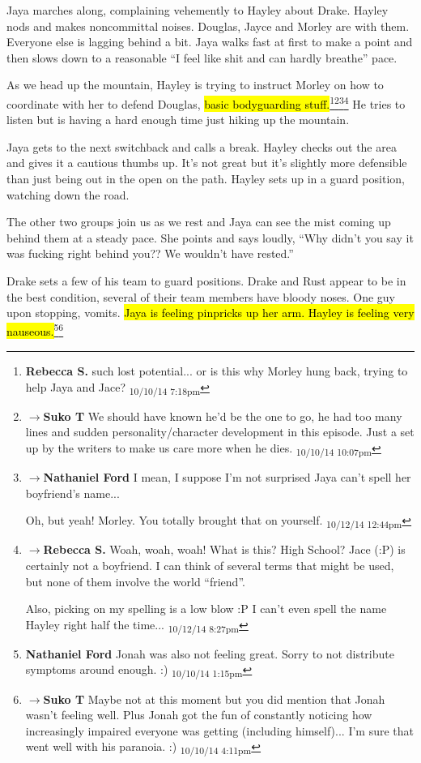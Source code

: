 Jaya marches along, complaining vehemently to Hayley about Drake.  Hayley nods and makes noncommittal noises.  Douglas, Jayce and Morley are with them.  Everyone else is lagging behind a bit.  Jaya walks fast at first to make a point and then slows down to a reasonable ``I feel like shit and can hardly breathe'' pace.

As we head up the mountain, Hayley is trying to instruct Morley on how to coordinate with her to defend Douglas, \hl{basic bodyguarding stuff.}\footnote{\textbf{Rebecca S. }such lost potential... or is this why Morley hung back, trying to help Jaya and Jace? \textsubscript{10/10/14 7:18pm}}\footnote{$\rightarrow$\textbf{Suko T }We should have known he'd be the one to go, he had too many lines and sudden personality/character development in this episode.  Just a set up by the writers to make us care more when he dies. \textsubscript{10/10/14 10:07pm}}\footnote{$\rightarrow$\textbf{Nathaniel Ford }I mean, I suppose I'm not surprised Jaya can't spell her boyfriend's name...

Oh, but yeah! Morley. You totally brought that on yourself. \textsubscript{10/12/14 12:44pm}}\footnote{$\rightarrow$\textbf{Rebecca S. }Woah, woah, woah! What is this? High School?  Jace (:P) is certainly not a boyfriend. I can think of several terms that might be used, but none of them involve the world ``friend''.  

Also, picking on my spelling is a low blow :P  I can't even spell the name Hayley right half the time... \textsubscript{10/12/14 8:27pm}}  He tries to listen but is having a hard enough time just hiking up the mountain.

Jaya gets to the next switchback and calls a break.  Hayley checks out the area and gives it a cautious thumbs up.  It's not great but it's slightly more defensible than just being out in the open on the path.  Hayley sets up in a guard position, watching down the road.  

The other two groups join us as we rest and Jaya can see the mist coming up behind them at a steady pace.  She points and says loudly, ``Why didn't you say it was fucking right behind you??  We wouldn't have rested.''

Drake sets a few of his team to guard positions.  Drake and Rust appear to be in the best condition, several of their team members have bloody noses.  One guy upon stopping, vomits.  \hl{Jaya is feeling pinpricks up her arm.  Hayley is feeling very nauseous.}\footnote{\textbf{Nathaniel Ford }Jonah was also not feeling great. Sorry to not distribute symptoms around enough. :) \textsubscript{10/10/14 1:15pm}}\footnote{$\rightarrow$\textbf{Suko T }Maybe not at this moment but you did mention that Jonah wasn't feeling well.  Plus Jonah got the fun of constantly noticing how increasingly impaired everyone was getting (including himself)... I'm sure that went well with his paranoia. :) \textsubscript{10/10/14 4:11pm}}



